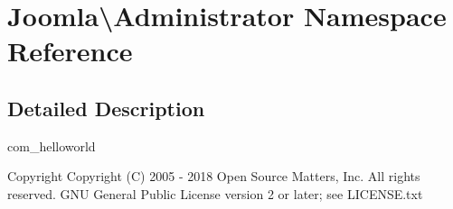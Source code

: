 \section{Joomla\textbackslash{}Administrator Namespace Reference}
\label{namespace_joomla_1_1_administrator}


\subsection{Detailed Description}
com\+\_\+helloworld

\begin{DoxyCopyright}{Copyright}
Copyright (C) 2005 -\/ 2018 Open Source Matters, Inc. All rights reserved.  G\+NU General Public License version 2 or later; see L\+I\+C\+E\+N\+S\+E.\+txt 
\end{DoxyCopyright}
